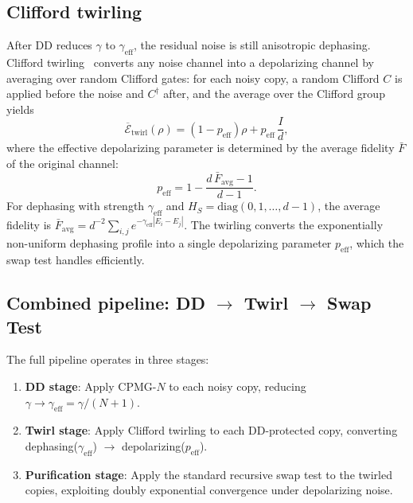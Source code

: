 \documentclass[prx,twocolumn,superscriptaddress,longbibliography,floatfix]{revtex4-2}
\begin{document}
\subsection{Clifford twirling}
\label{sec:twirling}

After DD reduces $\gamma$ to $\gamma_\mathrm{eff}$, the residual noise is still anisotropic dephasing.
Clifford twirling~\cite{Wallman2016} converts any noise channel into a depolarizing channel by averaging over random Clifford gates: for each noisy copy, a random Clifford $C$ is applied before the noise and $C^\dagger$ after, and the average over the Clifford group yields
\begin{equation}
\overline{\mathcal{E}}_\mathrm{twirl}(\rho) = (1 - p_\mathrm{eff})\rho + p_\mathrm{eff}\, \frac{I}{d},
\label{eq:twirl}
\end{equation}
where the effective depolarizing parameter is determined by the average fidelity $\bar{F}$ of the original channel:
\begin{equation}
p_\mathrm{eff} = 1 - \frac{d\, \bar{F}_\mathrm{avg} - 1}{d - 1}.
\label{eq:p_eff}
\end{equation}
For dephasing with strength $\gamma_\mathrm{eff}$ and $H_S = \mathrm{diag}(0, 1, \ldots, d-1)$, the average fidelity is $\bar{F}_\mathrm{avg} = d^{-2}\sum_{i,j} e^{-\gamma_\mathrm{eff}|E_i - E_j|}$.
The twirling converts the exponentially non-uniform dephasing profile into a single depolarizing parameter $p_\mathrm{eff}$, which the swap test handles efficiently.

\subsection{Combined pipeline: DD $\to$ Twirl $\to$ Swap Test}
\label{sec:pipeline}

The full pipeline operates in three stages:
\begin{enumerate}
\item \textbf{DD stage}: Apply CPMG-$N$ to each noisy copy, reducing $\gamma \to \gamma_\mathrm{eff} = \gamma/(N+1)$.
\item \textbf{Twirl stage}: Apply Clifford twirling to each DD-protected copy, converting dephasing($\gamma_\mathrm{eff}$) $\to$ depolarizing($p_\mathrm{eff}$).
\item \textbf{Purification stage}: Apply the standard recursive swap test to the twirled copies, exploiting doubly exponential convergence under depolarizing noise.
\end{enumerate}
\end{document}
